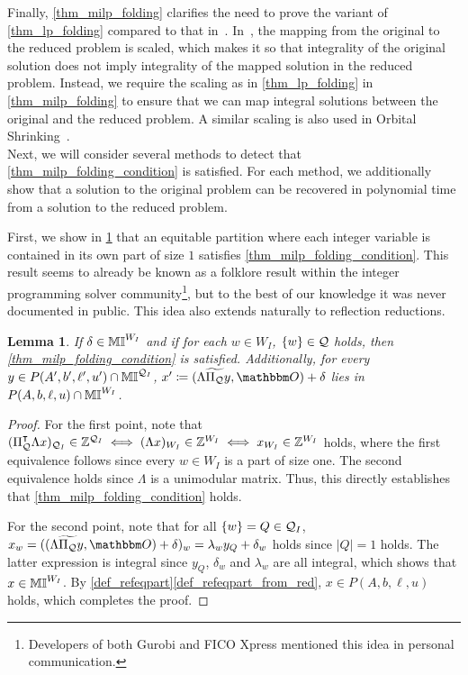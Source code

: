 \documentclass[pdflatex,sn-mathphys-num]{sn-jnl}%
\theoremstyle{thmstyleone}%
\newtheorem{lemma}[lemma]{Lemma}
\theoremstyle{thmstylethree}%
\theoremstyle{thmstyletwo}%
\begin{document}
Finally, \cref{thm_milp_folding} clarifies the need to prove the variant of \cref{thm_lp_folding} compared to that in~\cite{Grohe2014}. In~\cite{Grohe2014}, the mapping from the original to the reduced problem is scaled, which makes it so that integrality of the original solution does not imply integrality of the mapped solution in the reduced problem. Instead, we require the scaling as in \cref{thm_lp_folding} in \cref{thm_milp_folding} to ensure that we can map integral solutions between the original and the reduced problem. A similar scaling is also used in Orbital Shrinking~\cite{Fischetti2017}.\\

Next, we will consider several methods to detect that \eqref{thm_milp_folding_condition} is satisfied. For each method, we additionally show that a solution to the original problem can be recovered in polynomial time from a solution to the reduced problem.

First, we show in \cref{thm_integer_unit_partition} that an equitable partition where each integer variable is contained in its own part of size $1$ satisfies \eqref{thm_milp_folding_condition}. This result seems to already be known as a folklore result within the integer programming solver community\footnote{Developers of both Gurobi and FICO Xpress mentioned this idea in personal communication.}, but to the best of our knowledge it was never documented in public. This idea also extends naturally to reflection reductions.

\begin{lemma}    \label{thm_integer_unit_partition}
    If $\delta\in \mathbb{MI}^{W_I}$ and if for each $w\in W_I$, $\{w\}\in \mathcal{Q}$ holds, then \eqref{thm_milp_folding_condition} is satisfied. Additionally, for every $y\in P(A',b',\ell',u')\cap \mathbb{MI}^{\mathcal{Q}_I}$, $x' \coloneqq (\Lambda \widetilde{\Pi_\MQ} y, \zerovec)  + \delta$ lies in $P(A,b,\ell, u)\cap \mathbb{MI}^{W_I}$.
\end{lemma}
\begin{proof}
    For the first point, note that $(\Pi_{\mathcal{Q}}^{\intercal} \Lambda x)_{\mathcal{Q}_I} \in \mathbb{Z}^{\mathcal{Q}_I} \iff (\Lambda x)_{W_I} \in \mathbb{Z}^{W_I} \iff x_{W_I} \in \mathbb{Z}^{W_I}$ holds, where the first equivalence follows since every $w\in W_I$ is a part of size one. The second equivalence holds since $\Lambda$ is a unimodular matrix. Thus, this directly establishes that \eqref{thm_milp_folding_condition} holds.
    
    For the second point, note that for all $\{w\} = Q\in \mathcal{Q}_{I}$, $x_w=((\Lambda \widetilde{\Pi_\MQ} y, \zerovec)  + \delta)_w = \lambda_w y_Q + \delta_w$ holds since $|Q|=1$ holds. The latter expression is integral since $y_Q$, $\delta_w$ and $\lambda_w$ are all integral, which shows that $x\in \mathbb{MI}^{W_I}$. By \cref{def_refeqpart}\ref{def_refeqpart_from_red}, $x\in P(A,b,\ell,u)$ holds, which completes the proof.
\end{proof}
\end{document}
